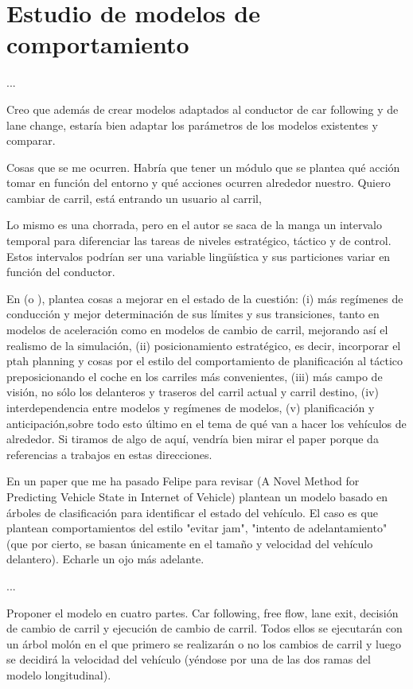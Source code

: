 \chapter{Estudio de modelos de comportamiento}
\label{ch:behavior-models-study}

...

Creo que además de crear modelos adaptados al conductor de car following y de lane change, estaría bien adaptar los parámetros de los modelos existentes y comparar.

Cosas que se me ocurren. Habría que tener un módulo que se plantea qué acción tomar en función del entorno y qué acciones ocurren alrededor nuestro. Quiero cambiar de carril, está entrando un usuario al carril,

Lo mismo es una chorrada, pero en \cite{Alexiadis2004} el autor se saca de la manga un intervalo temporal para diferenciar las tareas de niveles estratégico, táctico y de control. Estos intervalos podrían ser una variable lingüística y sus particiones variar en función del conductor.

En \cite{Toledo2007} (o \cite{Toledo2007-3}), plantea cosas a mejorar en el estado de la cuestión: (i) más regímenes de conducción y mejor determinación de sus límites y sus transiciones, tanto en modelos de aceleración como en modelos de cambio de carril, mejorando así el realismo de la simulación, (ii) posicionamiento estratégico, es decir, incorporar el ptah planning y cosas por el estilo del comportamiento de planificación al táctico preposicionando el coche en los carriles más convenientes, (iii) más campo de visión, no sólo los delanteros y traseros del carril actual y carril destino, (iv) interdependencia entre modelos y regímenes de modelos, (v) planificación y anticipación,sobre todo esto último en el tema de qué van a hacer los vehículos de alrededor. Si tiramos de algo de aquí, vendría bien mirar el paper porque da referencias a trabajos en estas direcciones.

En un paper que me ha pasado Felipe para revisar (A Novel Method for Predicting Vehicle State in Internet of Vehicle) plantean un modelo basado en árboles de clasificación para identificar el estado del vehículo. El caso es que plantean comportamientos del estilo "evitar jam", "intento de adelantamiento" (que por cierto, se basan únicamente en el tamaño y velocidad del vehículo delantero). Echarle un ojo más adelante.

...

Proponer el modelo en cuatro partes. Car following, free flow, lane exit, decisión de cambio de carril y ejecución de cambio de carril. Todos ellos se ejecutarán con un árbol molón en el que primero se realizarán o no los cambios de carril y luego se decidirá la velocidad del vehículo (yéndose por una de las dos ramas del modelo longitudinal).

